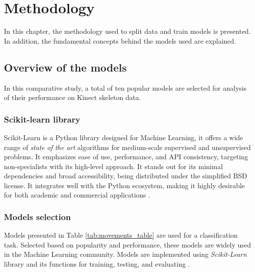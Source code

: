 \hypersetup{colorlinks=true, linkcolor=blue, citecolor=red}

\chapter{Methodology} \label{chap:methodology}

    In this chapter, the methodology used to split data and train models is presented. In addition, the fundamental concepts behind the models used are explained.

    \section{Overview of the models}

        In this comparative study, a total of ten popular models are selected for analysis of their performance on Kinect skeleton data.

        \subsection{Scikit-learn library}  

            Scikit-Learn is a Python library designed for Machine Learning, it offers a wide range of \textit{state of the art} algorithms for medium-scale supervised and unsupervised problems. It emphasizes ease of use, performance, and API consistency, targeting non-specialists with its high-level approach. It stands out for its minimal dependencies and broad accessibility, being distributed under the simplified BSD license. It integrates well with the Python ecosystem, making it highly desirable for both academic and commercial applications \cite{scikit-learn}.

        \subsection{Models selection}

        Models presented in Table \ref{tab:movements_table} are used for a classification task. Selected based on popularity and performance, these models are widely used in the Machine Learning community. Models are implemented using \textit{Scikit-Learn} library and its functions for training, testing, and evaluating \cite{sklearn_api}. 

        \newpage 

